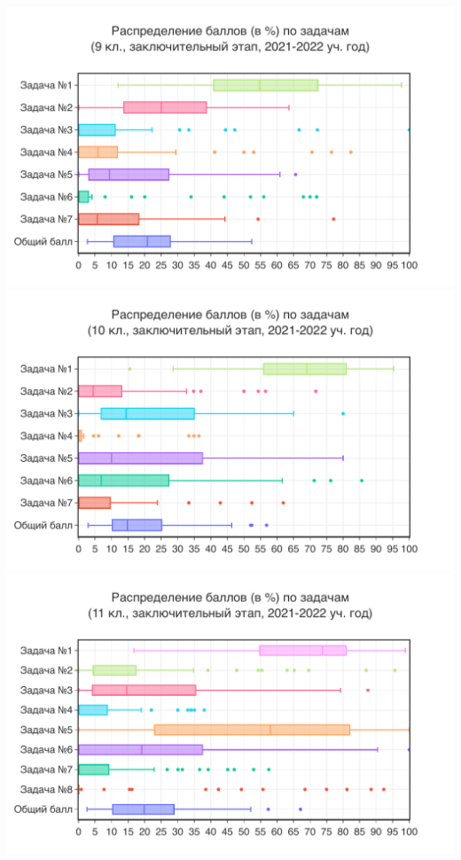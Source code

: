\includegraphics[width=\linewidth]{../export/pdf/results/2022/respa/grade9-dist-box.pdf}
\includegraphics[width=\linewidth]{../export/pdf/results/2022/respa/grade10-dist-box.pdf}
\includegraphics[width=\linewidth]{../export/pdf/results/2022/respa/grade11-dist-box.pdf}

